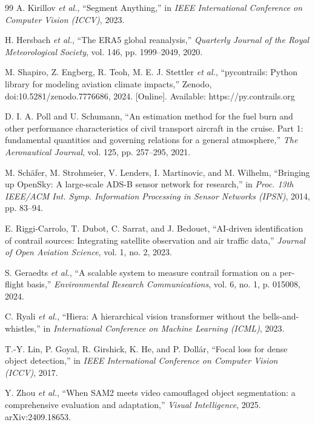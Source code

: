 \documentclass[review]{elsarticle}
\begin{document}
\begin{thebibliography}{99}
A. Kirillov \textit{et al.}, ``Segment Anything,'' in \textit{IEEE International Conference on Computer Vision (ICCV)}, 2023.

H. Hersbach \textit{et al.}, ``The ERA5 global reanalysis,'' \textit{Quarterly Journal of the Royal Meteorological Society}, vol. 146, pp. 1999--2049, 2020.

M. Shapiro, Z. Engberg, R. Teoh, M. E. J. Stettler \textit{et al.}, ``pycontrails: Python library for modeling aviation climate impacts,'' Zenodo, doi:10.5281/zenodo.7776686, 2024. [Online]. Available: https://py.contrails.org

D. I. A. Poll and U. Schumann, ``An estimation method for the fuel burn and other performance characteristics of civil transport aircraft in the cruise. Part 1: fundamental quantities and governing relations for a general atmosphere,'' \textit{The Aeronautical Journal}, vol. 125, pp. 257--295, 2021.

M. Sch\"{a}fer, M. Strohmeier, V. Lenders, I. Martinovic, and M. Wilhelm, ``Bringing up OpenSky: A large-scale ADS-B sensor network for research,'' in \textit{Proc. 13th IEEE/ACM Int. Symp. Information Processing in Sensor Networks (IPSN)}, 2014, pp. 83--94.

E. Riggi-Carrolo, T. Dubot, C. Sarrat, and J. Bedouet, ``AI-driven identification of contrail sources: Integrating satellite observation and air traffic data,'' \textit{Journal of Open Aviation Science}, vol. 1, no. 2, 2023.

S. Geraedts \textit{et al.}, ``A scalable system to measure contrail formation on a per-flight basis,'' \textit{Environmental Research Communications}, vol. 6, no. 1, p. 015008, 2024.

C. Ryali \textit{et al.}, ``Hiera: A hierarchical vision transformer without the bells-and-whistles,'' in \textit{International Conference on Machine Learning (ICML)}, 2023.

T.-Y. Lin, P. Goyal, R. Girshick, K. He, and P. Doll\'{a}r, ``Focal loss for dense object detection,'' in \textit{IEEE International Conference on Computer Vision (ICCV)}, 2017.

Y. Zhou \textit{et al.}, ``When SAM2 meets video camouflaged object segmentation: a comprehensive evaluation and adaptation,'' \textit{Visual Intelligence}, 2025. arXiv:2409.18653.


\end{thebibliography}
\end{document}
